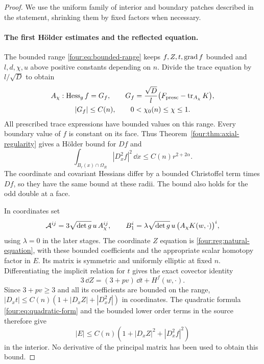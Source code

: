 \begin{proof}
We use the uniform family of interior and boundary patches described
in the statement, shrinking them by fixed factors when necessary.

\paragraph{The first H\"older estimates and the reflected equation.}
The bounded range \eqref{four:eq:bounded-range} keeps
$f,Z,t,\operatorname{grad} f$ bounded and $l,d,\chi,u$ above positive constants
depending on $n$.  Divide the trace equation by $l/\sqrt D$ to obtain
\begin{equation}\label{four:reg:trace-normalized}
 \begin{gathered}
 A_\chi:\operatorname{Hess}_g f=G_f,\qquad
 G_f=\frac{\sqrt D}{l}
          \bigl(F_{\rm presc}-\operatorname{tr}_{A_\chi}K\bigr),\\
 |G_f|\le C(n),\qquad 0<\chi_0(n)\le\chi\le1.
 \end{gathered}
\end{equation}
All prescribed trace expressions have bounded values on this range.
Every boundary value of $f$ is constant on its face.  Thus
Theorem~\ref{four:thm:axial-regularity} gives a H\"older bound for $Df$
and
\begin{equation}\label{four:reg:f-morrey}
 \int_{B_r(x)\cap\Omega_R}|D_x^2f|^2\,\dd x
                         \le C(n)r^{2+2\alpha}.
\end{equation}
The coordinate and covariant Hessians differ by a bounded
Christoffel term times $Df$, so they have the same bound at these
radii.  The bound also holds for the odd double at a face.

In coordinates set
\[
 \mathcal A^{ij}=3\sqrt{\det g}\,u\,A_\chi^{ij},\qquad
 B_1^i=\lambda\sqrt{\det g}\,u\,
                     \bigl(A_\chi K(w,\cdot)\bigr)^i,
\]
using $\lambda=0$ in the later stages.  The coordinate $Z$ equation
is \eqref{four:reg:natural-equation}, with these bounded coefficients
and the appropriate scalar homotopy factor in $E$.  Its matrix
is symmetric and uniformly elliptic at fixed $n$.
Differentiating the implicit relation for $t$ gives the exact
covector identity
\begin{equation}\label{four:reg:t-differential}
 3\,\dd Z=(3+pv)\,\dd t+H^f(w,\cdot).
\end{equation}
Since $3+pv\ge3$ and all its coefficients are bounded on the range,
$|D_xt|\le C(n)(1+|D_xZ|+|D_x^2f|)$ in coordinates.
The quadratic formula \eqref{four:eq:quadratic-form} and the bounded
lower order terms in the source therefore give
\begin{equation}\label{four:reg:coupled-source}
 |E|\le C(n)(1+|D_xZ|^2+|D_x^2f|^2)
\end{equation}
in the interior.  No derivative of the principal matrix has been
used to obtain this bound.


\end{proof}
